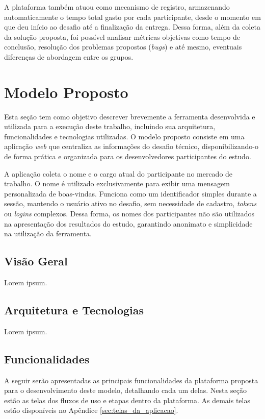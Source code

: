 \documentclass[english,brazilian]{UNISINOSartigo} %
\begin{document}
A plataforma também atuou como mecanismo de registro, armazenando automaticamente o tempo total gasto por cada participante, desde o momento em que deu início ao desafio até a finalização da entrega. Dessa forma, além da coleta da solução proposta, foi possível analisar métricas objetivas como tempo de conclusão, resolução dos problemas propostos (\textit{bugs}) e até mesmo, eventuais diferenças de abordagem entre os grupos.

\section{Modelo Proposto}

Esta seção tem como objetivo descrever brevemente a ferramenta desenvolvida e utilizada para a execução deste trabalho, incluindo sua arquitetura, funcionalidades e tecnologias utilizadas. O modelo proposto consiste em uma aplicação \textit{web} que centraliza as informações do desafio técnico, disponibilizando-o de forma prática e organizada para os desenvolvedores participantes do estudo.

A aplicação coleta o nome e o cargo atual do participante no mercado de trabalho. O nome é utilizado exclusivamente para exibir uma mensagem personalizada de boas-vindas. Funciona como um identificador simples durante a sessão, mantendo o usuário ativo no desafio, sem necessidade de cadastro, \textit{tokens} ou \textit{logins} complexos. Dessa forma, os nomes dos participantes não são utilizados na apresentação dos resultados do estudo, garantindo anonimato e simplicidade na utilização da ferramenta.

\subsection{Visão Geral}

Lorem ipsum.

\subsection{Arquitetura e Tecnologias}

Lorem ipsum.

\subsection{Funcionalidades}

A seguir serão apresentadas as principais funcionalidades da plataforma proposta para o desenvolvimento deste modelo, detalhando cada um delas. Nesta seção estão as telas dos fluxos  de uso e etapas dentro da plataforma. As demais telas estão disponíveis no Apêndice \ref{sec:telas_da_aplicacao}.
\end{document}
